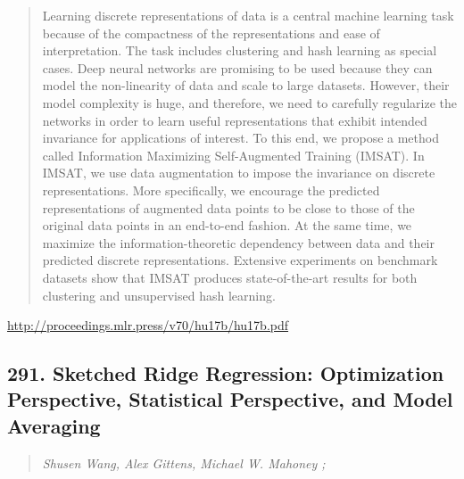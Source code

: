 \documentclass{article}
\begin{document}
\begin{quote}
    Learning discrete representations of data is a central machine learning task because of the compactness of the representations and ease of interpretation. The task includes clustering and hash learning as special cases. Deep neural networks are promising to be used because they can model the non-linearity of data and scale to large datasets. However, their model complexity is huge, and therefore, we need to carefully regularize the networks in order to learn useful representations that exhibit intended invariance for applications of interest. To this end, we propose a method called Information Maximizing Self-Augmented Training (IMSAT). In IMSAT, we use data augmentation to impose the invariance on discrete representations. More specifically, we encourage the predicted representations of augmented data points to be close to those of the original data points in an end-to-end fashion. At the same time, we maximize the information-theoretic dependency between data and their predicted discrete representations. Extensive experiments on benchmark datasets show that IMSAT produces state-of-the-art results for both clustering and unsupervised hash learning.  \end{quote}

\href{http://proceedings.mlr.press/v70/hu17b/hu17b.pdf}{http://proceedings.mlr.press/v70/hu17b/hu17b.pdf}

\subsection{291. Sketched Ridge Regression: Optimization Perspective, Statistical Perspective, and Model Averaging}

\begin{quote}
\footnotesize{\textit{Shusen Wang, Alex Gittens, Michael W. Mahoney ;}}
\end{quote}
\end{document}
